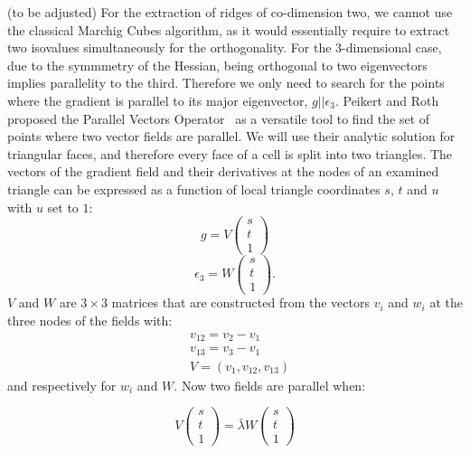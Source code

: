 (to be adjusted)
For the extraction of ridges of co-dimension two, we cannot use the
classical Marchig Cubes algorithm, as it would essentially require to
extract two isovalues simultaneously for the orthogonality. For the
3-dimensional case, due to the symmmetry of the Hessian, being
orthogonal to two eigenvectors implies parallelity to the third.
Therefore we only need to search for the points where the gradient is
parallel to its major eigenvector, $g||\epsilon_3$. Peikert and Roth
proposed the Parallel Vectors Operator~\cite{PV} as a versatile tool to
find the set of points where two vector fields are parallel. We will use
their analytic solution for triangular faces, and therefore every face
of a cell is split into two triangles. The vectors of the gradient field
and their derivatives at the nodes of an examined triangle can be
expressed as a function of local triangle coordinates $s$, $t$ and $u$
with $u$ set to $1$:
\begin{equation}
  g = V
  \begin{pmatrix}
    s\\
    t\\
    1
  \end{pmatrix}
\end{equation}
\begin{equation}
  \epsilon_3 = W
  \begin{pmatrix}
    s\\
    t\\
    1
  \end{pmatrix}.
\end{equation}
\noindent $V$ and $W$ are $3 \times 3$ matrices that are constructed
from the vectors $v_i$ and $w_i$ at the three nodes of the fields with:
\begin{align}
  &v_{12} = v_2 - v_1\\
  &v_{13} = v_3 - v_1\\
  &V = (v_1, v_{12}, v_{13})
\end{align}
\noindent and respectively for $w_i$ and $W$. Now two fields are
parallel when:

\begin{equation}
  V
  \begin{pmatrix}
    s\\
    t\\
    1
  \end{pmatrix}
  = \bar{\lambda} W
  \begin{pmatrix}
    s\\
    t\\
    1
  \end{pmatrix}
\end{equation}


